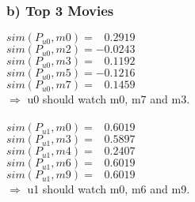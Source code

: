 \documentclass{article}
\begin{document}
\subsubsection*{b) Top 3 Movies }
$sim(P_{u0},m0)=\;\;\:0.2919$\\
$sim(P_{u0},m2)=-0.0243$\\
$sim(P_{u0},m3)=\;\;\:0.1192$\\
$sim(P_{u0},m5)=-0.1216$\\
$sim(P_{u0},m7)=\;\;\:0.1459$\\
$\Rightarrow$ u0 should watch m0, m7 and m3.\\
\\
$sim(P_{u1},m0)=\;\;\:0.6019$\\
$sim(P_{u1},m3)=\;\;\:0.5897$\\
$sim(P_{u1},m4)=\;\;\:0.2407$\\
$sim(P_{u1},m6)=\;\;\:0.6019$\\
$sim(P_{u1},m9)=\;\;\:0.6019$\\
$\Rightarrow$ u1 should watch m0, m6 and m9.\\
\newpage
\end{document}
